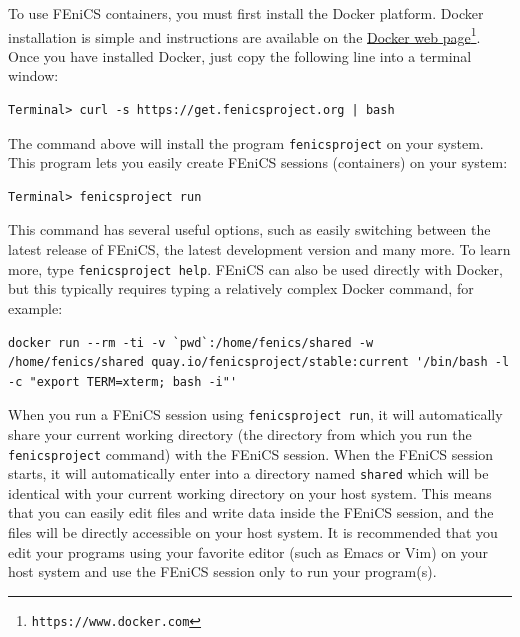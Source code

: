 \documentclass[graybox,envcountchap,sectrefs,final]{svmonodo}
\newenvironment{notice_mdfboxadmon}[1][]{
\begin{notice_mdfboxmdframed}[frametitle=#1]
}
{
\end{notice_mdfboxmdframed}
}
\begin{document}

To use FEniCS containers, you must first install the Docker
platform. Docker installation is simple and instructions are available
on the \href{{https://www.docker.com}}{Docker web page}\footnote{\texttt{https://www.docker.com}}. Once you have installed
Docker, just copy the following line into a
terminal window:

\begin{Verbatim}[frame=lines,label=\fbox{{\tiny Terminal}},framesep=2.5mm,framerule=0.7pt,fontsize=\fontsize{9pt}{9pt}]
Terminal> curl -s https://get.fenicsproject.org | bash
\end{Verbatim}

The command above will install the program \texttt{fenicsproject} on your
system. This program lets you easily create FEniCS sessions
(containers) on your system:


\begin{Verbatim}[frame=lines,label=\fbox{{\tiny Terminal}},framesep=2.5mm,framerule=0.7pt,fontsize=\fontsize{9pt}{9pt}]
Terminal> fenicsproject run
\end{Verbatim}
This command has several useful options, such as easily switching
between the latest release of FEniCS, the latest development version
and many more. To learn more, type \texttt{fenicsproject help}. FEniCS can
also be used directly with Docker, but this typically requires
typing a relatively complex Docker command, for example:

\begin{Verbatim}[frame=lines,label=\fbox{{\tiny Terminal}},framesep=2.5mm,framerule=0.7pt,fontsize=\fontsize{9pt}{9pt}]
docker run --rm -ti -v `pwd`:/home/fenics/shared -w
/home/fenics/shared quay.io/fenicsproject/stable:current '/bin/bash -l
-c "export TERM=xterm; bash -i"'
\end{Verbatim}

\begin{notice_mdfboxadmon}
When you run a FEniCS session using \texttt{fenicsproject run}, it will
automatically share your current working directory (the directory
from which you run the \texttt{fenicsproject} command) with the FEniCS
session. When the FEniCS session starts, it will automatically
enter into a directory named \texttt{shared} which will be identical with
your current working directory on your host system. This means that
you can easily edit files and write data inside the FEniCS session, and
the files will be directly accessible on your host system. It is
recommended that you edit your programs using your favorite editor
(such as Emacs or Vim) on your host system and use the FEniCS session
only to run your program(s).
\end{notice_mdfboxadmon} %
\end{document}
